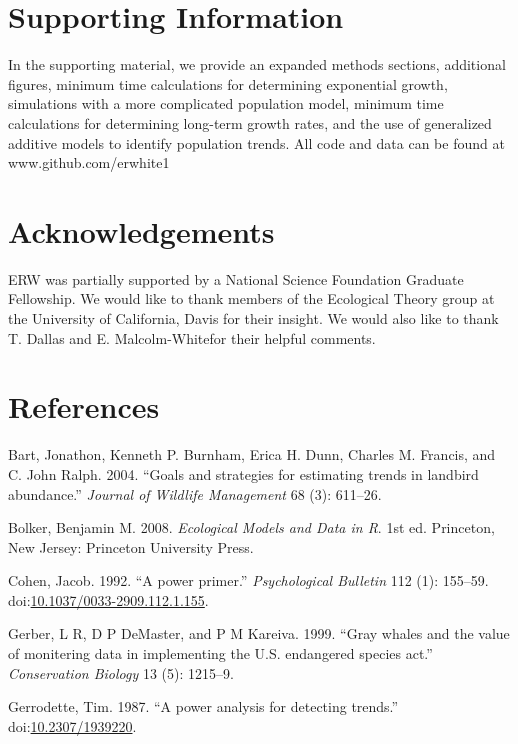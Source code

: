 \documentclass[12pt,]{article}
\begin{document}
\section{Supporting Information}\label{supporting-information}

In the supporting material, we provide an expanded methods sections,
additional figures, minimum time calculations for determining
exponential growth, simulations with a more complicated population
model, minimum time calculations for determining long-term growth rates,
and the use of generalized additive models to identify population
trends. All code and data can be found at www.github.com/erwhite1

\section{Acknowledgements}\label{acknowledgements}

ERW was partially supported by a National Science Foundation Graduate
Fellowship. We would like to thank members of the Ecological Theory
group at the University of California, Davis for their insight. We would
also like to thank T. Dallas and E. Malcolm-Whitefor their helpful
comments.

\section{References}\label{references}

\hypertarget{refs}{}
\hypertarget{ref-Bart2004}{}
Bart, Jonathon, Kenneth P. Burnham, Erica H. Dunn, Charles M. Francis,
and C. John Ralph. 2004. ``Goals and strategies for estimating trends in
landbird abundance.'' \emph{Journal of Wildlife Management} 68 (3):
611--26.

\hypertarget{ref-Bolker2008}{}
Bolker, Benjamin M. 2008. \emph{Ecological Models and Data in R}. 1st
ed. Princeton, New Jersey: Princeton University Press.

\hypertarget{ref-Cohen1992}{}
Cohen, Jacob. 1992. ``A power primer.'' \emph{Psychological Bulletin}
112 (1): 155--59.
doi:\href{https://doi.org/10.1037/0033-2909.112.1.155}{10.1037/0033-2909.112.1.155}.

\hypertarget{ref-Gerber1999}{}
Gerber, L R, D P DeMaster, and P M Kareiva. 1999. ``Gray whales and the
value of monitering data in implementing the U.S. endangered species
act.'' \emph{Conservation Biology} 13 (5): 1215--9.

\hypertarget{ref-Gerrodette1987}{}
Gerrodette, Tim. 1987. ``A power analysis for detecting trends.''
doi:\href{https://doi.org/10.2307/1939220}{10.2307/1939220}.
\end{document}
